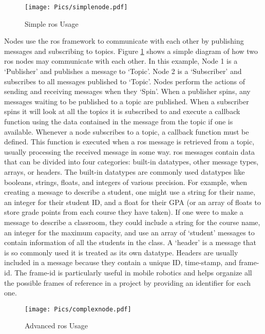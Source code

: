 \begin{figure}[h!]
    \centering
    \texttt{[image: Pics/simplenode.pdf]}
    \caption{Simple \acrshort{ros} Usage}
    \label{fig:rosmessage}
\end{figure}

Nodes use the \acrshort{ros} framework to communicate with each other by publishing messages and subscribing to topics. Figure \ref{fig:rosmessage} shows a simple diagram of how two \acrshort{ros} nodes may communicate with each other. In this example, Node 1 is a `Publisher' and publishes a message to `Topic'. Node 2 is a `Subscriber' and subscribes to all messages published to `Topic'. Nodes perform the actions of sending and receiving messages when they `Spin'. When a publisher spins, any messages waiting to be published to a topic are published. When a subscriber spins it will look at all the topics it is subscribed to and execute a callback function using the data contained in the message from the topic if one is available. Whenever a node subscribes to a topic, a callback function must be defined. This function is executed when a \acrshort{ros} message is retrieved from a topic, usually processing the received message in some way. \acrshort{ros} messages contain data that can be divided into four categories: built-in datatypes, other message types, arrays, or headers. The built-in datatypes are commonly used datatypes like booleans, strings, floats, and integers of various precision. For example, when creating a message to describe a student, one might use a string for their name, an integer for their student ID, and a float for their GPA (or an array of floats to store grade points from each course they have taken). If one were to make a message to describe a classroom, they could include a string for the course name, an integer for the maximum capacity, and use an array of `student' messages to contain information of all the students in the class. A `header' is a message that is so commonly used it is treated as its own datatype. Headers are usually included in a message because they contain a unique ID, time-stamp, and frame-id. The frame-id is particularly useful in mobile robotics and helps organize all the possible frames of reference in a project by providing an identifier for each one.\\

\begin{figure}[h!]
    \centering
    \texttt{[image: Pics/complexnode.pdf]}
    \caption{Advanced \acrshort{ros} Usage}
    \label{fig:roscomplex}
\end{figure}

